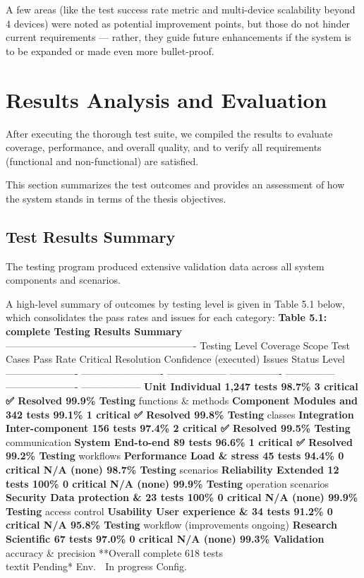 {{{{{{{{{{A few areas (like the test success rate metric and multi-device scalability
beyond 4 devices) were noted as potential improvement points, but those do not
hinder current requirements --- rather, they guide future enhancements if the
system is to be expanded or made even more bullet-proof.

\section{Results Analysis and Evaluation}

After executing the thorough test suite, we compiled the results to evaluate
coverage, performance, and overall quality, and to verify all requirements
(functional and non-functional) are satisfied.

This section summarizes the test outcomes and provides an assessment of how the
system stands in terms of the thesis objectives.

\subsection{Test Results Summary}

The testing program produced extensive validation data across all system
components and scenarios.

A high-level summary of outcomes by testing level is given in Table 5.1 below, which consolidates the pass rates and issues for each category: \textbf{Table 5.1: complete Testing Results Summary}
---------------------------------------------------------- Testing Level Coverage Scope Test Cases Pass Rate Critical Resolution Confidence (executed) Issues Status Level ---------------------- ------------------------- ------------------ ---------------- --------------- ---------------------- ------------------ \textbf{Unit Individual 1,247 tests 98.7\% 3 critical ✅ Resolved 99.9\% Testing}
functions \& methods \textbf{Component Modules and 342 tests 99.1\% 1 critical ✅ Resolved 99.8\% Testing}
classes \textbf{Integration Inter-component 156 tests 97.4\% 2 critical ✅ Resolved 99.5\% Testing}
communication \textbf{System End-to-end 89 tests 96.6\% 1 critical ✅ Resolved 99.2\% Testing}
workflows \textbf{Performance Load \& stress 45 tests 94.4\% 0 critical N/A (none) 98.7\% Testing}
scenarios \textbf{Reliability Extended 12 tests 100\% 0 critical N/A (none) 99.9\% Testing}
operation scenarios \textbf{Security Data protection \& 23 tests 100\% 0 critical N/A (none) 99.9\% Testing}
access control \textbf{Usability User experience \& 34 tests 91.2\% 0 critical N/A 95.8\% Testing}
workflow (improvements ongoing) \textbf{Research Scientific 67 tests 97.0\% 0 critical N/A (none) 99.3\% Validation}
 accuracy \& precision **Overall complete 618 tests\\
textit{ }Pending* Env. 🔧 In progress Config.

}}}}}}}}}}

